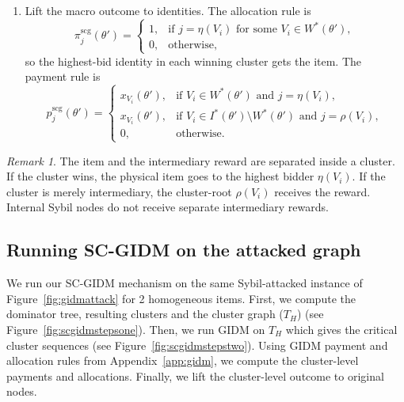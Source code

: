 \documentclass[sigconf]{aamas}
\theoremstyle{definition}
\theoremstyle{remark}
\newtheorem{remark}[theorem]{Remark}
\begin{document}
\begin{framed}
\begin{enumerate}[leftmargin=1.5em]
  \item Lift the macro outcome to identities. The allocation rule is
  \[
  \pi^{\mathrm{scg}}_j(\theta')=
  \begin{cases}
  1,
  & \text{if } j=\eta(V_i) \text{ for some } V_i\in W^*(\theta'),\\
  0,
  & \text{otherwise,}
  \end{cases}
  \]
  so the highest-bid identity in each winning cluster gets the item. The payment rule is
  \[
  p^{\mathrm{scg}}_j(\theta')=
  \begin{cases}
  x_{V_i}(\theta'),
  & \text{if } V_i\in W^*(\theta') \text{ and } j=\eta(V_i),\\
  x_{V_i}(\theta'),
  & \text{if } V_i\in I^*(\theta')\setminus W^*(\theta') \text{ and } j=\rho(V_i),\\
  0,
  & \text{otherwise.}
  \end{cases}
  \]
\end{enumerate}
\end{framed}

\begin{remark}
The item and the intermediary reward are separated inside a cluster. If the cluster wins, the physical item goes to the highest bidder $\eta(V_i)$. If the cluster is merely intermediary, the cluster-root $\rho(V_i)$ receives the reward. Internal Sybil nodes do not receive separate intermediary rewards.
\end{remark}

\subsection{Running SC-GIDM on the attacked graph}
We run our SC-GIDM mechanism on the same Sybil-attacked instance of Figure~\ref{fig:gidmattack} for 2 homogeneous items. First, we compute the dominator tree, resulting clusters and the cluster graph ($T_H$) (see Figure~\ref{fig:scgidmstepsone}). 
Then, we run GIDM on $T_H$ which gives the critical cluster sequences (see Figure~\ref{fig:scgidmstepstwo}). 
Using GIDM payment and allocation rules from Appendix~\ref{app:gidm}, we compute the cluster-level payments and allocations. 
Finally, we lift the cluster-level outcome to original nodes.
\end{document}
